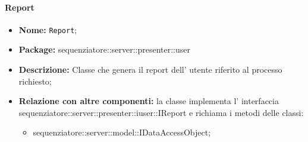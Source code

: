 \paragraph{Report}
	\begin{itemize}
		\item \textbf{Nome:} \texttt{Report};
		\item \textbf{Package:} sequenziatore::server::presenter::user
		\item \textbf{Descrizione:} Classe che genera il report dell' utente riferito al processo richiesto;
		\item \textbf{Relazione con altre componenti:} la classe implementa l' interfaccia sequenziatore::server::presenter::iuser::IReport e richiama i metodi delle classi:
		\begin{itemize}
			\item sequenziatore::server::model::IDataAccessObject;
		\end{itemize}
	\end{itemize}
